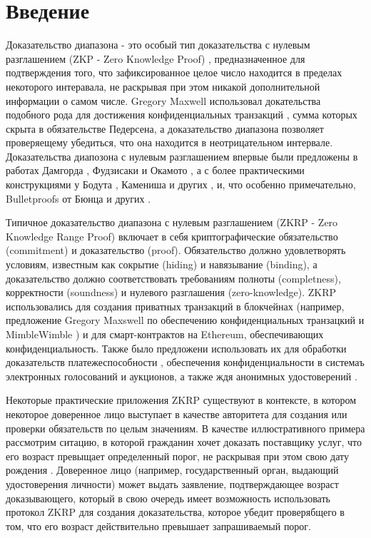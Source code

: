 \chapter{Введение}
Доказательство диапазона - это особый тип доказательства с нулевым разглашением (ZKP - Zero Knowledge Proof) \cite{10.1145/22145.22178}, предназначенное для подтверждения того, что зафиксированное целое число находится в пределах некоторого интеравала, не раскрывая при этом никакой дополнительной информации о самом числе.
Gregory Maxwell использовал докательства подобного рода для достижения конфиденциальных транзакций \cite{maxwell2016first}, сумма которых скрыта в обязательстве Педерсена, а доказательство диапазона позволяет проверяещему убедиться, что она находится в неотрицательном интервале.
Доказательства диапозона с нулевым разглашением впервые были предложены в работах Дамгорда \cite{eurocrypt-1993-2249}, Фудзисаки и Окамото \cite{10.5555/646762.706160}, а с более практическими конструкциями у Бодута \cite{10.1007/3-540-45539-6_31}, Камениша и других \cite{10.1007/978-3-540-89255-7_15}, и, что особенно примечательно, Bulletproofs от Бюнца и других \cite{8418611}.

Типичное доказательство диапазона с нулевым разглашением (ZKRP - Zero Knowledge Range Proof) включает в себя криптографические обязательство (commitment) и доказательство (proof).
Обязательство должно удовлетворять условиям, известным как сокрытие (hiding) и навязывание (binding), а доказательство должно соответствовать требованиям полноты (completness), корректности (soundness) и нулевого разглашения (zero-knowledge).
ZKRP использовались для создания приватных транзакций в блокчейнах (например, предложение Gregory Maxswell по обеспечению конфиденциальных транзацкий \cite{maxwell2016first} и MimbleWimble \cite{poelstra2016mimblewimble}) и для смарт-контрактов на Ethereum, обеспечивающих конфиденциальность.
Также было предложени использовать их для обработки доказательств платежеспособности \cite{cryptoeprint:2020/468, 10.1145/2810103.2813674}, обеспечения конфиденциальности в системаъ электронных голосований и аукционов, а также ждя анонимных удостоверений \cite{morais2019survey}.

Некоторые практические приложения ZKRP существуют в контексте, в котором некоторое доверенное лицо выступает в качестве авторитета для создания или проверки обязательств по целым значениям.
В качестве иллюстративного примера рассмотрим ситацию, в которой гражданин хочет доказать поставщику услуг, что его возраст превыщает определенный порог, не раскрывая при этом свою дату рождения \cite{asecuritysite_11123, shah2017zeroknowledge}.
Доверенное лицо (например, государственный орган, выдающий удостоверения личности) может выдать заявление, подтверждающее возраст доказывающего, который в свою очередь имеет возможность использовать протокол ZKRP для создания доказательства, которое убедит проверябщего в том, что его возраст действительно превышает запрашиваемый порог.

